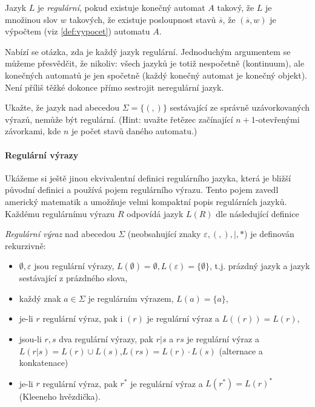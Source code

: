 \begin{theorem} Jazyk \(L\) je \emph{regulární}, pokud existuje konečný automat \(A\) takový, že
\(L\) je množinou slov \(w\) takových, že existuje posloupnost stavů \(\overline{s}\), že \((\overline{s},w)\) je
výpočtem (viz \ref{def:vypocet}) automatu \(A\). 
\end{theorem}

Nabízí se otázka, zda je každý jazyk regulární. Jednoduchým argumentem se můžeme přesvědčit, že nikoliv: všech jazyků
je totiž nespočetně (kontinuum), ale konečných automatů je jen spočetně (každý konečný automat je konečný objekt).
Není příliš těžké dokonce přímo sestrojit neregulární jazyk.

\begin{cviceni}\label{cv:zavorky}
Ukažte, že jazyk nad abecedou \(\Sigma=\{(,)\}\) sestávající ze správně uzávorkovaných výrazů, nemůže
být regulární.  (Hint: uvažte řetězec začínající \(n+1\)-otevřenými závorkami, kde \(n\) je počet stavů daného automatu.)
\end{cviceni}

\paragraph{Regulární výrazy}
Ukážeme si ještě jinou ekvivalentní definici regulárního jazyka, která je bližší původní definici a používá pojem regulárního výrazu. 
Tento pojem zavedl americký matematik  a umožňuje velmi kompaktní popis regulárních jazyků. Každému regulárnímu
výrazu \(R\) odpovídá jazyk \(L(R)\) dle následující definice

\begin{definition} \emph{Regulární výraz} nad abecedou \(\Sigma\) 
(neobsahující znaky \(\varepsilon,(,),|,*\)) je definován rekurzivně:
\begin{itemize}
 \item \(\emptyset, \varepsilon\) jsou regulární výrazy, \(L(\emptyset)=\emptyset, L(\varepsilon) = \{\emptyset\}\),  t.j. prázdný jazyk a jazyk sestávající z prázdného slova,
 \item každý znak \(a\in\Sigma\) je regulárním výrazem, \(L(a) = \{a\}\),
 \item je-li \(r\) regulární výraz, pak i \((r)\) je regulární výraz a \(L((r)) = L(r)\),
 \item jsou-li \(r,s\) dva regulární výrazy, pak \(r|s\) a \(rs\) je regulární výraz a \(L(r|s)=L(r)\cup L(s)\),\(L(rs)=L(r)\cdot L(s)\) (alternace a konkatenace)
 \item je-li \(r\) regulární výraz, pak \(r^*\) je regulární výraz a \(L(r^*) = L(r)^*\) (Kleeneho hvězdička).
\end{itemize}
\end{definition}

